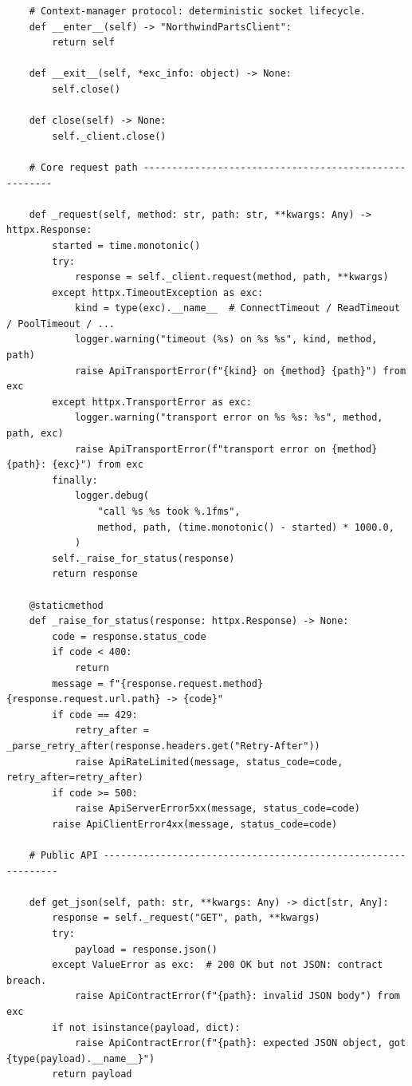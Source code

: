 \begin{verbatim}
    # Context-manager protocol: deterministic socket lifecycle.
    def __enter__(self) -> "NorthwindPartsClient":
        return self

    def __exit__(self, *exc_info: object) -> None:
        self.close()

    def close(self) -> None:
        self._client.close()

    # Core request path ------------------------------------------------------

    def _request(self, method: str, path: str, **kwargs: Any) -> httpx.Response:
        started = time.monotonic()
        try:
            response = self._client.request(method, path, **kwargs)
        except httpx.TimeoutException as exc:
            kind = type(exc).__name__  # ConnectTimeout / ReadTimeout / PoolTimeout / ...
            logger.warning("timeout (%s) on %s %s", kind, method, path)
            raise ApiTransportError(f"{kind} on {method} {path}") from exc
        except httpx.TransportError as exc:
            logger.warning("transport error on %s %s: %s", method, path, exc)
            raise ApiTransportError(f"transport error on {method} {path}: {exc}") from exc
        finally:
            logger.debug(
                "call %s %s took %.1fms",
                method, path, (time.monotonic() - started) * 1000.0,
            )
        self._raise_for_status(response)
        return response

    @staticmethod
    def _raise_for_status(response: httpx.Response) -> None:
        code = response.status_code
        if code < 400:
            return
        message = f"{response.request.method} {response.request.url.path} -> {code}"
        if code == 429:
            retry_after = _parse_retry_after(response.headers.get("Retry-After"))
            raise ApiRateLimited(message, status_code=code, retry_after=retry_after)
        if code >= 500:
            raise ApiServerError5xx(message, status_code=code)
        raise ApiClientError4xx(message, status_code=code)

    # Public API --------------------------------------------------------------

    def get_json(self, path: str, **kwargs: Any) -> dict[str, Any]:
        response = self._request("GET", path, **kwargs)
        try:
            payload = response.json()
        except ValueError as exc:  # 200 OK but not JSON: contract breach.
            raise ApiContractError(f"{path}: invalid JSON body") from exc
        if not isinstance(payload, dict):
            raise ApiContractError(f"{path}: expected JSON object, got {type(payload).__name__}")
        return payload


\end{verbatim}
